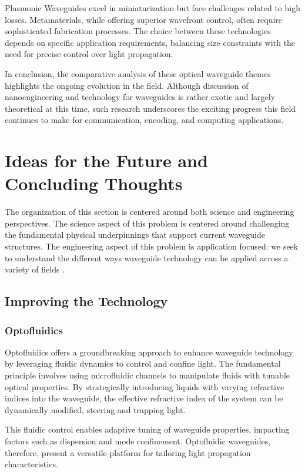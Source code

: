 \documentclass[10pt]{article}
\begin{document}
Plasmonic Waveguides excel in miniaturization but face challenges related to high losses. Metamaterials, while offering superior wavefront control, often require sophisticated fabrication processes. The choice between these technologies depends on specific application requirements, balancing size constraints with the need for precise control over light propagation.

In conclusion, the comparative analysis of these optical waveguide themes highlights the ongoing evolution in the field.
Although discussion of nanoengineering and technology for waveguides is rather exotic and largely theoretical at this time, 
such research underscores the exciting progress this field continues to make for communication, encoding, and computing applications.

\section{Ideas for the Future and Concluding Thoughts}


The organization of this section is centered around both science and engineering perspectives.
The science aspect of this problem is centered around challenging the fundamental physical underpinnings that support
current waveguide structures. The engineering aspect of this problem is application focused: we seek to understand the
different ways waveguide technology can be applied across a variety of fields \cite{ref04}.




\subsection{Improving the Technology}


\subsubsection{Optofluidics}
Optofluidics offers a groundbreaking approach to enhance waveguide technology by leveraging fluidic dynamics to control and confine light.
The fundamental principle involves using microfluidic channels to manipulate fluids with tunable optical properties.
By strategically introducing liquids with varying refractive indices into the waveguide,
the effective refractive index of the system can be dynamically modified, steering and trapping light.


This fluidic control enables adaptive tuning of waveguide properties,
impacting factors such as dispersion and mode confinement. Optofluidic waveguides,
therefore, present a versatile platform for tailoring light propagation characteristics.
\end{document}
